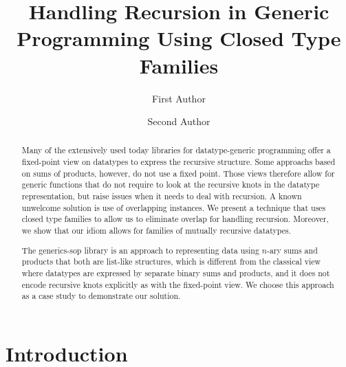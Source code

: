 \documentclass[runningheads]{llncs}
\begin{document}
%
\title{Handling Recursion in Generic Programming Using Closed Type Families}
%
%
\author{First Author \and
Second Author}
%
%
%
\maketitle              %
%
\begin{abstract}
Many of the extensively used today libraries for datatype-generic programming offer a fixed-point view on datatypes to express the recursive structure. Some approachs based on sums of products, however, do not use a fixed point. Those views therefore allow for generic functions that do not require to look at the recursive knots in the datatype representation, but raise issues when it needs to deal with recursion. A known unwelcome solution is use of overlapping instances. We present a technique that uses closed type families to allow us to eliminate overlap for handling recursion. Moreover, we show that our idiom allows for families of mutually recursive datatypes.

The \textsf{generics-sop} library is an approach to representing data using $n$-ary sums and products that both are list-like structures, which is different from the classical view where datatypes are expressed by separate binary sums and products, and it does not encode recursive knots explicitly as with the fixed-point view. We choose this approach as a case study to demonstrate our solution.

\end{abstract}
%
%
%
\section{Introduction}
\label{sec:introduction}
\end{document}
